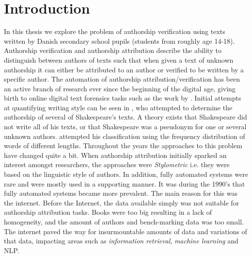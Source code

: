 %

\section{Introduction} \label{sec:introduction}


In this thesis we explore the problem of authorship verification using texts
written by Danish secondary school pupils (students from roughly age 14-18).
Authorship verification and authorship attribution describe the ability to
distinguish between authors of texts such that when given a text of unknown
authorship it can either be attributed to an author or verified to be written
by a specific author. The automation of authorship attribution/verification
has been an active branch of research ever since the beginning of the digital
age, giving birth to online digital text forensics tasks such as the work
by \citet{pan:2015}. Initial attempts at quantifying writing style can be
seen in \citet{Mendenhall237}, who attempted to determine the authorship of
several of Shakespeare's texts. A theory exists that Shakespeare did not write
all of his texts, or that Shakespeare was a pseudonym for one or several
unknown authors. \citet{Mendenhall237} attempted his classification using the
frequency distribution of words of different lengths. Throughout the years
the approaches to this problem have changed quite a bit. When authorship
attribution initially sparked an interest amongst researchers, the approaches
were \textit{Stylometric} i.e. they were based on the linguistic style of
authors. In addition, fully automated systems were rare and were mostly used
in a supporting manner. It was during the 1990's that fully automated systems
became more prevalent. The main reason for this was the internet. Before the
Internet, the data available simply was not suitable for authorship attribution
tasks. Books were too big resulting in a lack of homogeneity, and the amount
of authors and bench-marking data was too small. The internet paved the way
for insurmountable amounts of data and variations of that data, impacting
areas such as \textit{information retrieval}, \textit{machine learning} and
\gls{NLP}.\cite{stamatos2009}

